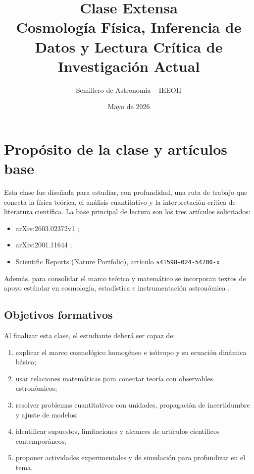 \documentclass[12pt,oneside]{book}
\title{Clase Extensa\\[0.5em]
Cosmología Física, Inferencia de Datos y Lectura Crítica de Investigación Actual}
\author{Semillero de Astronomía -- IEEOH}
\date{Mayo de 2026}
\begin{document}
\frontmatter
\maketitle
\tableofcontents

\mainmatter

\chapter{Propósito de la clase y artículos base}

Esta clase fue diseñada para estudiar, con profundidad, una ruta de trabajo que conecta
la física teórica, el análisis cuantitativo y la interpretación crítica de literatura científica.
La base principal de lectura son los tres artículos solicitados:
\begin{itemize}[leftmargin=1.5em]
  \item arXiv:2603.02372v1 \citep{arxiv2603};
  \item arXiv:2001.11644 \citep{arxiv2001};
  \item Scientific Reports (Nature Portfolio), artículo \texttt{s41598-024-54700-x} \citep{srep2024}.
\end{itemize}

Además, para consolidar el marco teórico y matemático se incorporan textos de apoyo estándar
en cosmología, estadística e instrumentación astronómica \citep{dodelson,ryden,hogg1999,trotta2008,wall2012}.

\section{Objetivos formativos}
Al finalizar esta clase, el estudiante deberá ser capaz de:
\begin{enumerate}[leftmargin=1.5em]
  \item explicar el marco cosmológico homogéneo e isótropo y su ecuación dinámica básica;
  \item usar relaciones matemáticas para conectar teoría con observables astronómicos;
  \item resolver problemas cuantitativos con unidades, propagación de incertidumbre y ajuste de modelos;
  \item identificar supuestos, limitaciones y alcances de artículos científicos contemporáneos;
  \item proponer actividades experimentales y de simulación para profundizar en el tema.
\end{enumerate}
\end{document}
